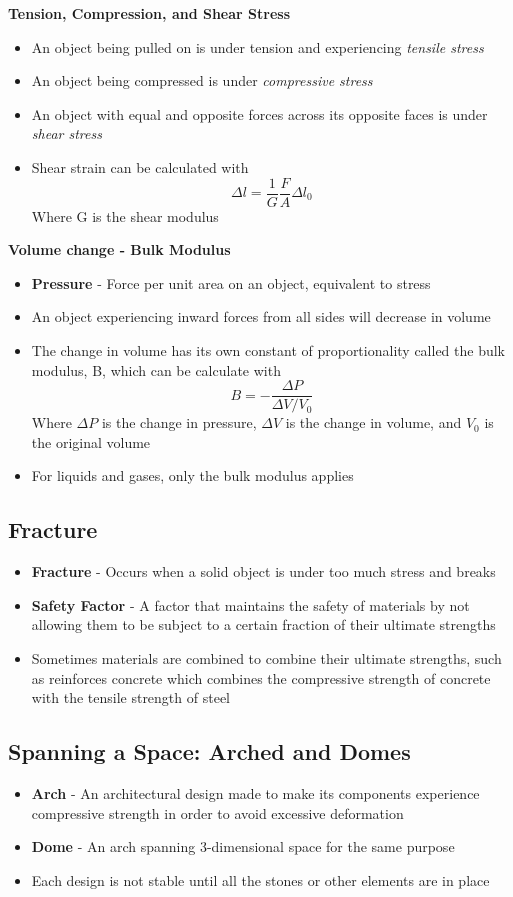\textbf{Tension, Compression, and Shear Stress}
\begin{itemize}
    \item An object being pulled on is under tension and experiencing \emph{tensile stress}
    \item An object being compressed is under \emph{compressive stress}
    \item An object with equal and opposite forces across its opposite faces is under \emph{shear stress}
    \item Shear strain can be calculated with \[\Delta l=\frac{1}{G}\frac{F}{A}\Delta l_0\] Where G is the shear modulus
\end{itemize}

\textbf{Volume change - Bulk Modulus}
\begin{itemize}
    \item \textbf{Pressure} - Force per unit area on an object, equivalent to stress
    \item An object experiencing inward forces from all sides will decrease in volume
    \item The change in volume has its own constant of proportionality called the bulk modulus, B, which can be calculate with \[B=-\frac{\Delta P}{\Delta V/V_0}\] Where \(\Delta P\) is the change in pressure, \(\Delta V\) is the change in volume, and \(V_0\) is the original volume
    \item For liquids and gases, only the bulk modulus applies
\end{itemize}

\subsection{Fracture}
\begin{itemize}
    \item \textbf{Fracture} - Occurs when a solid object is under too much stress and breaks
    \item \textbf{Safety Factor} - A factor that maintains the safety of materials by not allowing them to be subject to a certain fraction of their ultimate strengths
    \item Sometimes materials are combined to combine their ultimate strengths, such as reinforces concrete which combines the compressive strength of concrete with the tensile strength of steel
\end{itemize}

\subsection{Spanning a Space: Arched and Domes}
\begin{itemize}
    \item \textbf{Arch} - An architectural design made to make its components experience compressive strength in order to avoid excessive deformation
    \item \textbf{Dome} - An arch spanning 3-dimensional space for the same purpose
    \item Each design is not stable until all the stones or other elements are in place
\end{itemize}

\newpage